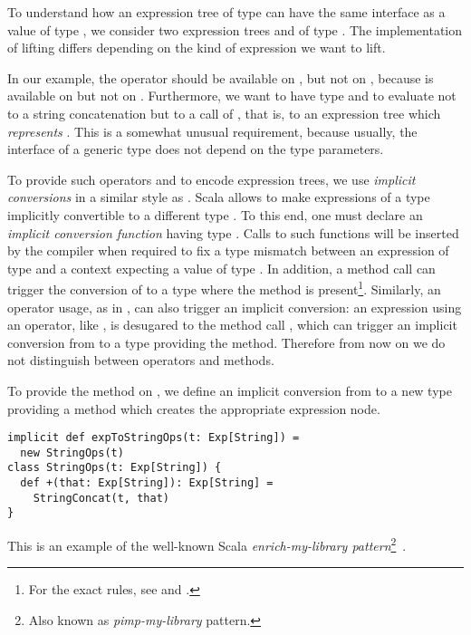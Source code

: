 To understand how an expression tree of type  can have the same interface as a value of type , we consider two expression trees  and  of type . The implementation of lifting differs depending on the kind of expression we want to lift.

In our example, the operator \code{+} should be available on , but not on , because \code{+} is available on  but not on .
Furthermore, we want  to have type  and to evaluate not to a string concatenation but to a call of , that is, to an expression tree which \emph{represents} . This is a somewhat unusual requirement, because usually, the interface of a generic type does not depend on the type parameters.

To provide such operators and to encode expression trees, we use \emph{implicit conversions} in a similar style as \citet{rompf2010lightweight}. Scala allows to make expressions of a type  implicitly convertible to a different type . To this end, one must declare an \emph{implicit conversion function} having type . Calls to such functions will be inserted by the compiler when required to fix a type mismatch between an expression of type  and a context expecting a value of type . In addition, a method call  can trigger the conversion of  to a type where the method  is present\footnote{For the exact rules, see \citet[Ch.~21]{Odersky11book} and \citet{ScalaRef}.}. Similarly, an operator usage, as in , can also trigger an implicit conversion: an expression using an operator, like , is desugared to the method call , which can trigger an implicit conversion from  to a type providing the \code{+} method. Therefore from now on we do not distinguish between operators and methods.

To provide the method \code{+} on , we define an implicit conversion from  to a new type providing a \code{+} method which creates the appropriate expression node.
\begin{lstlisting}
implicit def expToStringOps(t: Exp[String]) =
  new StringOps(t)
class StringOps(t: Exp[String]) {
  def +(that: Exp[String]): Exp[String] =
    StringConcat(t, that)
}
\end{lstlisting}
This is an example of the well-known Scala \emph{enrich-my-library pattern}\footnote{Also known as \emph{pimp-my-library} pattern.}~\citep{OderskyPimpLib}.
 
